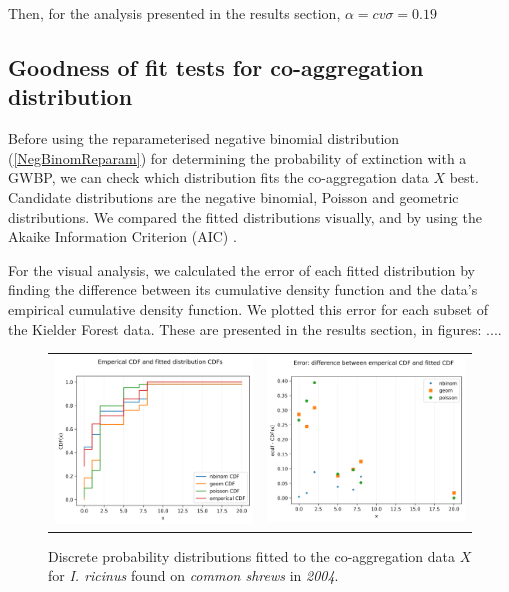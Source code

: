 \documentclass{article}
\begin{document}
Then, for the analysis presented in the results section, $ \alpha = cv\sigma = 0.19 $

\subsection{Goodness of fit tests for co-aggregation distribution}

Before using the reparameterised negative binomial distribution (\ref{NegBinomReparam}) for determining the probability of extinction with a GWBP, we can check which distribution fits the co-aggregation data $ X $ best. Candidate distributions are the negative binomial, Poisson and geometric distributions. We compared the fitted distributions visually, and by using the Akaike Information Criterion (AIC) \cite{LloydSmith2005}.

For the visual analysis, we calculated the error of each fitted distribution by finding the difference between its cumulative density function and the data's empirical cumulative density function. We plotted this error for each subset of the Kielder Forest data. These are presented in the results section, in figures: .... 

\begin{figure}[h!]
	\centering
	\begin{tabular}{ll}
		\includegraphics[width=.48\linewidth,valign=m]{CDF_compare_2004_I.ricinus_SA} & \includegraphics[width=.48\linewidth,valign=m]{CDF_errors_2004_I.ricinus_SA}
	\end{tabular}
	\caption{Discrete probability distributions fitted to the co-aggregation data $ X $ for \textit{I. ricinus} found on \textit{common shrews} in \textit{2004}.}
	\label{fig:kielder_2004_iricinus_SA}
\end{figure}
\end{document}
